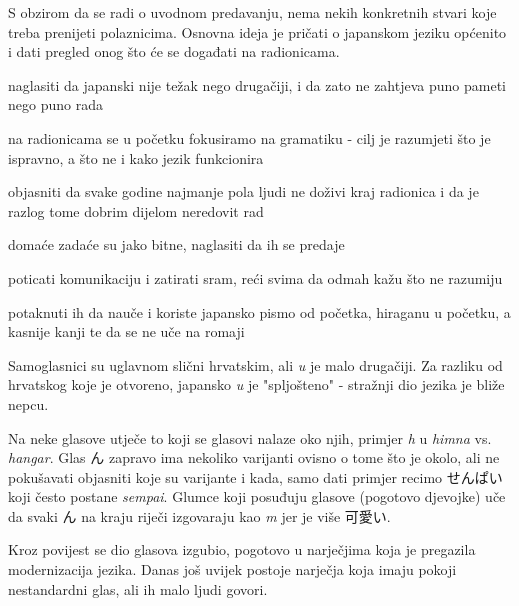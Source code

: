 
\author{autor}

	
	S obzirom da se radi o uvodnom predavanju, nema nekih konkretnih stvari koje treba prenijeti polaznicima. Osnovna ideja je pričati o japanskom jeziku općenito i dati pregled onog što će se događati na radionicama.
	
	\begin{hyou}
		\item naglasiti da japanski nije težak nego drugačiji, i da zato ne zahtjeva puno pameti nego puno rada
		\item na radionicama se u početku fokusiramo na gramatiku - cilj je razumjeti što je ispravno, a što ne i kako jezik funkcionira
		\item objasniti da svake godine najmanje pola ljudi ne doživi kraj radionica i da je razlog tome dobrim dijelom neredovit rad
		\item domaće zadaće su jako bitne, naglasiti da ih se predaje
		\item poticati komunikaciju i zatirati sram, reći svima da odmah kažu što ne razumiju
		\item potaknuti ih da nauče i koriste japansko pismo od početka, hiraganu u početku, a kasnije kanji te da se ne uče na romaji
	\end{hyou}

	
	Samoglasnici su uglavnom slični hrvatskim, ali \textit{u} je malo drugačiji. Za razliku od hrvatskog koje je otvoreno, japansko \textit{u} je "spljošteno" - stražnji dio jezika je bliže nepcu.
	
	\vspace{10pt}
	Na neke glasove utječe to koji se glasovi nalaze oko njih, primjer \textit{h} u \textit{himna} vs. \textit{hangar}. Glas ん zapravo ima nekoliko varijanti ovisno o tome što je okolo, ali ne pokušavati objasniti koje su varijante i kada, samo dati primjer recimo せんぱい koji često postane \textit{sempai}. Glumce koji posuđuju glasove (pogotovo djevojke) uče da svaki ん na kraju riječi izgovaraju kao \textit{m} jer je više 可愛い.
	
	\vspace{10pt}
	Kroz povijest se dio glasova izgubio, pogotovo u narječjima koja je pregazila modernizacija jezika. Danas još uvijek postoje narječja koja imaju pokoji nestandardni glas, ali ih malo ljudi govori.
	
